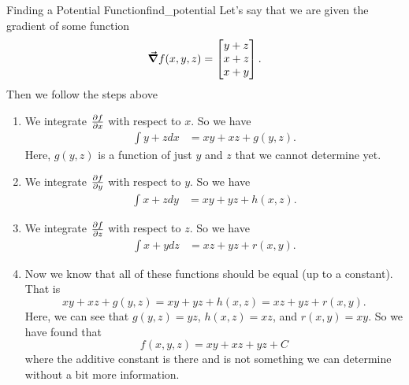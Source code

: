                    	        \begin{ex}{Finding a Potential Function}{find_potential}
                   	        Let's say that we are given the gradient of some function
                   	        \[
                   	        \boldsymbol{\vec{\nabla}} f(x,y,z) = \begin{bmatrix} y+z \\ x+z \\ x+y \end{bmatrix}.
                   	        \]
                   	        Then we follow the steps above
                   	        \begin{enumerate}[1.]
                   	            \item We integrate $\frac{\partial f}{\partial x}$ with respect to $x$.  So we have
                   	            \begin{align*}
                   	                \int y+z dx &= xy+xz + g(y,z).
                   	            \end{align*}
                   	            Here, $g(y,z)$ is a function of just $y$ and $z$ that we cannot determine yet.
                   	            \item We integrate $\frac{\partial f}{\partial y}$ with respect to $y$. So we have
                   	            \begin{align*}
                   	                \int x+z dy &= xy+yz + h(x,z).
                   	            \end{align*}
                   	            \item We integrate $\frac{\partial f}{\partial z}$ with respect to $z$. So we have
                   	            \begin{align*}
                   	                \int x+y dz &= xz+yz + r(x,y).
                   	            \end{align*}
                   	            \item Now we know that all of these functions should be equal (up to a constant).  That is
                   	            \[
                   	            xy+xz+g(y,z)=xy+yz+h(x,z)=xz+yz+r(x,y).
                   	            \]
                   	            Here, we can see that $g(y,z)=yz$, $h(x,z)=xz$, and $r(x,y)=xy$.  So we have found that 
                   	            \[
                   	            f(x,y,z) = xy + xz + yz + C
                   	            \]
                   	            where the additive constant is there and is not something we can determine without a bit more information.
                   	        \end{enumerate}
                   	        \end{ex}
                   	        
